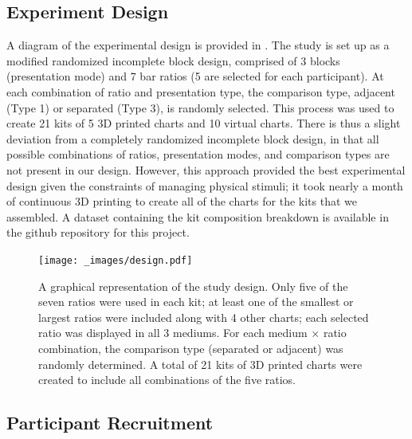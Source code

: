 \documentclass[letterpaper,inpress,dvipsnames]{jdsart}
\begin{document}
\hypertarget{experiment-design}{%
\subsection{Experiment Design}\label{experiment-design}}

A diagram of the experimental design is provided in . The study is set up as a modified randomized incomplete block design, comprised of 3 blocks (presentation mode) and 7 bar ratios (5 are selected for each participant). At each combination of ratio and presentation type, the comparison type, adjacent (Type 1) or separated (Type 3), is randomly selected. This process was used to create 21 kits of 5 3D printed charts and 10 virtual charts. There is thus a slight deviation from a completely randomized incomplete block design, in that all possible combinations of ratios, presentation modes, and comparison types are not present in our design. However, this approach provided the best experimental design given the constraints of managing physical stimuli; it took nearly a month of continuous 3D printing to create all of the charts for the kits that we assembled. A dataset containing the kit composition breakdown is available in the github repository for this project.

\begin{figure}
\centering
\texttt{[image: \_images/design.pdf]}
\caption{\label{fig:studyDesign}A graphical representation of the study design. Only five of the seven ratios were used in each kit; at least one of the smallest or largest ratios were included along with 4 other charts; each selected ratio was displayed in all 3 mediums. For each medium \(\times\) ratio combination, the comparison type (separated or adjacent) was randomly determined. A total of 21 kits of 3D printed charts were created to include all combinations of the five ratios.}
\end{figure}

\hypertarget{participant-recruitment}{%
\subsection{Participant Recruitment}\label{participant-recruitment}}
\end{document}
